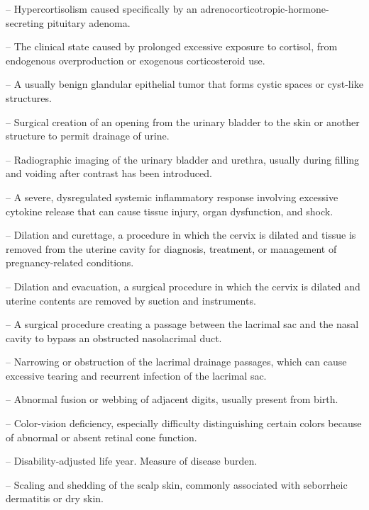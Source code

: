 -- Hypercortisolism caused specifically by an adrenocorticotropic-hormone-secreting pituitary adenoma.

-- The clinical state caused by prolonged excessive exposure to cortisol, from endogenous overproduction or exogenous corticosteroid use.

-- A usually benign glandular epithelial tumor that forms cystic spaces or cyst-like structures.

-- Surgical creation of an opening from the urinary bladder to the skin or another structure to permit drainage of urine.

-- Radiographic imaging of the urinary bladder and urethra, usually during filling and voiding after contrast has been introduced.

-- A severe, dysregulated systemic inflammatory response involving excessive cytokine release that can cause tissue injury, organ dysfunction, and shock.

-- Dilation and curettage, a procedure in which the cervix is dilated and tissue is removed from the uterine cavity for diagnosis, treatment, or management of pregnancy-related conditions.

-- Dilation and evacuation, a surgical procedure in which the cervix is dilated and uterine contents are removed by suction and instruments.

-- A surgical procedure creating a passage between the lacrimal sac and the nasal cavity to bypass an obstructed nasolacrimal duct.

-- Narrowing or obstruction of the lacrimal drainage passages, which can cause excessive tearing and recurrent infection of the lacrimal sac.

-- Abnormal fusion or webbing of adjacent digits, usually present from birth.

-- Color-vision deficiency, especially difficulty distinguishing certain colors because of abnormal or absent retinal cone function.

-- Disability-adjusted life year. Measure of disease burden.

-- Scaling and shedding of the scalp skin, commonly associated with seborrheic dermatitis or dry skin.

